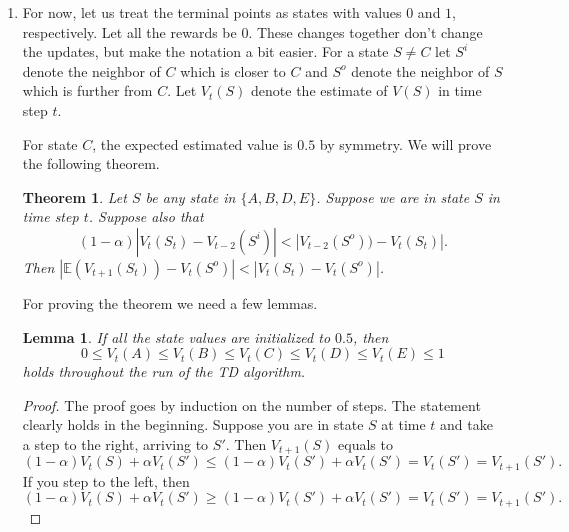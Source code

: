 \documentclass[12pt,a4paper]{article}
\newtheorem{lemma}{Lemma}
\newtheorem{thm}{Theorem}
\begin{document}
\begin{enumerate}
\begin{itemize}
\end{itemize}

\item
For now, let us treat the terminal points as states with values $0$ and $1$,
respectively. Let all the rewards be $0$. These changes together don't change
the updates, but make the notation a bit easier. For a state $S \neq C$ let
$S^i$ denote the neighbor of $C$ which is closer to $C$ and $S^o$ denote the
neighbor of $S$ which is further from $C$. Let $V_t(S)$ denote the estimate of
$V(S)$ in time step $t$.

For state $C$, the expected estimated value is $0.5$ by symmetry. We will prove
the following theorem.
\begin{thm}\label{thm}
  Let $S$ be any state in $\{A, B, D, E\}$. Suppose we are in state $S$ in
  time step $t$. Suppose also that
  \[(1 - \alpha) |V_t(S_t) - V_{t - 2} (S^i)| < |V_{t - 2}(S^o)) - V_t(S_t)|.\] Then
  $|\mathbb{E}(V_{t + 1}(S_t)) - V_{t}(S^o)| < |V_t(S_t) - V_{t}(S^o)|$.
\end{thm}

For proving the theorem we need a few lemmas.

\begin{lemma}
  If all the state values are initialized to $0.5$, then
  \[0 \le V_t(A) \le V_t(B) \le V_t(C) \le V_t(D) \le V_t(E) \le 1\] holds throughout the
  run of the TD algorithm.
\end{lemma}
\begin{proof}
  The proof goes by induction on the number of steps. The statement clearly holds
  in the beginning. Suppose you are in state $S$ at time $t$ and take a step
  to the right, arriving to $S'$. Then $V_{t + 1}(S)$ equals to
  \[(1 - \alpha) V_t(S) + \alpha V_t(S') \le (1 - \alpha) V_t(S') + \alpha V_t(S') = V_t(S') = V_{t + 1}(S').\]
  If you step to the left, then
  \[(1 - \alpha) V_t(S) + \alpha V_t(S') \ge (1 - \alpha) V_t(S') + \alpha V_t(S') = V_t(S') = V_{t + 1}(S').\]
\end{proof}


\end{enumerate}
\end{document}
